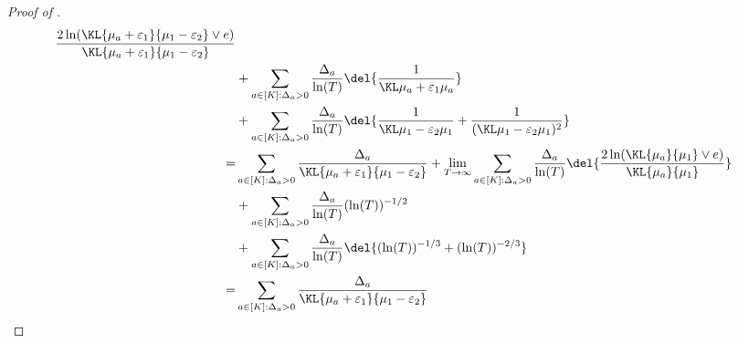 \begin{proof}[Proof of ]
\begin{align*}
{        \frac{2\ln(\KL{\mu_a+\varepsilon_1}{\mu_1-\varepsilon_2} \vee e)}{\KL{\mu_a+\varepsilon_1}{\mu_1-\varepsilon_2}} }
        \\
        &+
        \sum_{a\in[K]:\Delta_a > 0} \frac{\Delta_a}{\ln(T)} \del{ \ExpFTwo }
        \\
        &+
        \sum_{a\in[K]: \Delta_a > 0} \frac{\Delta_a}{\ln(T)} \del{\BadEventThreeBoundForAO}
        \\
        =&
        \sum_{a\in[K]:\Delta_a > 0}\frac{\Delta_a}{\KL{\mu_a+\varepsilon_1}{\mu_1-\varepsilon_2}} +
        \lim_{T \to \infty}
        \sum_{a\in[K]:\Delta_a > 0}
        \frac{\Delta_a}{\ln(T)} \del{ \frac{2\ln(\KL{\mu_a}{\mu_1} \vee e)}{\KL{\mu_a}{\mu_1}}}
        \\
        &+ \sum_{a\in[K]:\Delta_a > 0}
        \frac{\Delta_a}{\ln(T)}(\ln(T))^{-1/2}
        \\
        &+ \sum_{a\in[K]: \Delta_a > 0} \frac{\Delta_a}{\ln(T)}
        \del{(\ln(T))^{-1/3} + (\ln(T))^{-2/3}}
        \\
        =&
        \sum_{a\in[K]:\Delta_a > 0}\frac{\Delta_a}{\KL{\mu_a+\varepsilon_1}{\mu_1-\varepsilon_2}}
    \end{align*}

    
        

\end{proof}
